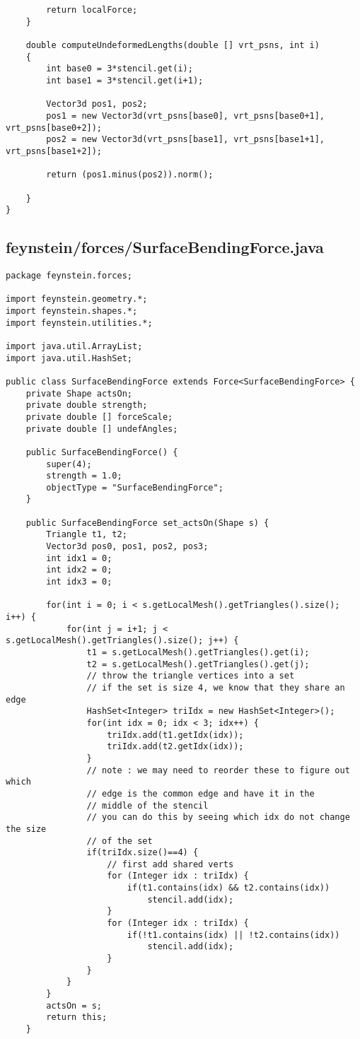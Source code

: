 \begin{lstlisting}
		return localForce;
	}
	
	double computeUndeformedLengths(double [] vrt_psns, int i)
	{
		int base0 = 3*stencil.get(i);
		int base1 = 3*stencil.get(i+1);
		
		Vector3d pos1, pos2;
		pos1 = new Vector3d(vrt_psns[base0], vrt_psns[base0+1], vrt_psns[base0+2]);
		pos2 = new Vector3d(vrt_psns[base1], vrt_psns[base1+1], vrt_psns[base1+2]);
		
		return (pos1.minus(pos2)).norm();
		
	}
}
\end{lstlisting}

\subsection*{feynstein/forces/SurfaceBendingForce.java}
\begin{lstlisting}
package feynstein.forces;

import feynstein.geometry.*;
import feynstein.shapes.*;
import feynstein.utilities.*;

import java.util.ArrayList;
import java.util.HashSet;

public class SurfaceBendingForce extends Force<SurfaceBendingForce> {
    private Shape actsOn;
    private double strength;
	private double [] forceScale;
	private double [] undefAngles;
	
    public SurfaceBendingForce() {
		super(4);
		strength = 1.0;
		objectType = "SurfaceBendingForce";
    }

    public SurfaceBendingForce set_actsOn(Shape s) {
		Triangle t1, t2;
		Vector3d pos0, pos1, pos2, pos3;
		int idx1 = 0;
		int idx2 = 0;
		int idx3 = 0;

		for(int i = 0; i < s.getLocalMesh().getTriangles().size(); i++) {
			for(int j = i+1; j < s.getLocalMesh().getTriangles().size(); j++) {
				t1 = s.getLocalMesh().getTriangles().get(i);
				t2 = s.getLocalMesh().getTriangles().get(j);
				// throw the triangle vertices into a set
				// if the set is size 4, we know that they share an edge 
				HashSet<Integer> triIdx = new HashSet<Integer>();
				for(int idx = 0; idx < 3; idx++) {
					triIdx.add(t1.getIdx(idx));
					triIdx.add(t2.getIdx(idx));
				}
				// note : we may need to reorder these to figure out which
				// edge is the common edge and have it in the 
				// middle of the stencil
				// you can do this by seeing which idx do not change the size
				// of the set
				if(triIdx.size()==4) {
					// first add shared verts
					for (Integer idx : triIdx) {
						if(t1.contains(idx) && t2.contains(idx))
							stencil.add(idx);
					}
					for (Integer idx : triIdx) {
						if(!t1.contains(idx) || !t2.contains(idx))
							stencil.add(idx);
					}
				}
			}
		}
		actsOn = s;
		return this;
    }


\end{lstlisting}
